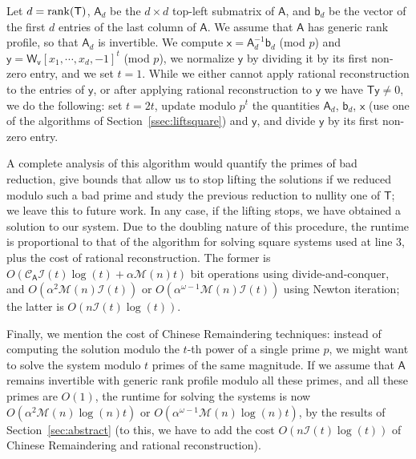 \documentclass[sigconf]{acmart}
\newcommand{\vb}{\ensuremath{\mathsf{b}}}
\newcommand{\vr}{\ensuremath{\mathsf{r}}}
\newcommand{\vv}{\ensuremath{\mathsf{v}}}
\newcommand{\vx}{\ensuremath{\mathsf{x}}}
\newcommand{\vy}{\ensuremath{\mathsf{y}}}
\newcommand{\mA}{\ensuremath{\mathsf{A}}}
\newcommand{\mT}{\ensuremath{\mathsf{T}}}
\newcommand{\mW}{\ensuremath{\mathsf{W}}}
\newcommand{\M}{\ensuremath{\mathscr{M}}}
\newcommand{\I}{\ensuremath{\mathscr{I}}}
\newcommand{\CA}{\ensuremath{\mathscr{C}_\mA}}
\theoremstyle{acmdefinition}
\begin{document}
Let $d={\rm rank}(\mT)$, $\mA_{d}$ be the $d \times d$ top-left
submatrix of $\mA$, and $\vb_d$ be the vector of the first $d$ entries
of the last column of $\mA$. We assume that $\mA$ has generic rank
profile, so that $\mA_{d}$ is invertible.  We compute
$\vx = \mA_d^{-1} \vb_d$ (mod $p$) and
$\vy = \mW_\vv [x_1, \cdots, x_d, -1]^t$ (mod $p$), we normalize $\vy$
by dividing it by its first non-zero entry, and we set $t=1$.  While
we either cannot apply rational reconstruction to the entries of
$\vy$, or after applying rational reconstruction to $\vy$ we have
$\mT \vy \ne 0$, we do the following: set $t = 2t$, update modulo
$p^t$ the quantities $\mA_{d}$, $\vb_d$, $\vx$ (use one of the
algorithms of Section~\ref{ssec:liftsquare}) and $\vy$, and divide
$\vy$ by its first non-zero entry.


A complete analysis of this algorithm would quantify the primes of bad
reduction, give bounds that allow us to stop lifting the solutions if
we reduced modulo such a bad prime and study the previous reduction to
nullity one of $\mT$; we leave this to future work.  In any case, if
the lifting stops, we have obtained a solution to our system. Due to
the doubling nature of this procedure, the runtime is proportional to
that of the algorithm for solving square systems used at line 3, plus
the cost of rational reconstruction. The former is
$O(\CA \I(t) \log(t) +\alpha \M(n) t)$ bit operations using
divide-and-conquer, and $O(\alpha^2 \M(n) \I(t))$ or
$O(\alpha^{\omega-1} \M(n) \I(t))$ using Newton iteration; the latter
is $O(n \I(t) \log(t))$.

Finally, we mention the cost of Chinese Remaindering techniques:
instead of computing the solution modulo the $t$-th power of a single
prime $p$, we might want to solve the system modulo $t$ primes of the
same magnitude.  If we assume that $\mA$ remains invertible with
generic rank profile modulo all these primes, and all these primes are
$O(1)$, the runtime for solving the systems is now $O(\alpha^{2} \M(n)
\log(n) t)$ or $O(\alpha^{\omega-1} \M(n) \log(n) t)$, by the results
of Section~\ref{sec:abstract} (to this, we have to add the cost $O(n
\I(t) \log(t))$ of Chinese Remaindering and rational reconstruction).
\end{document}
